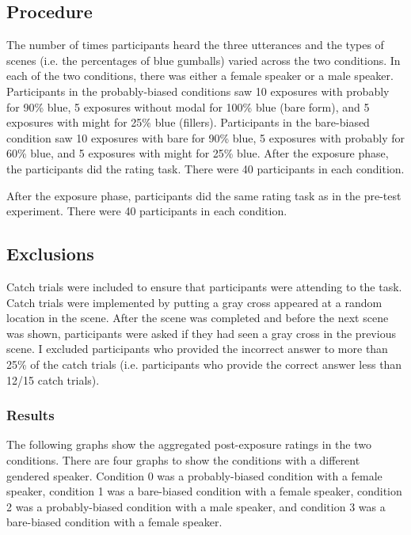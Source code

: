 \documentclass{sp}          %
\begin{document}
\subsection{Procedure}
The number of times participants heard the three utterances and the types of scenes (i.e. the percentages of blue gumballs) varied across the two conditions. In each of the two conditions, there was either a female speaker or a male speaker. Participants in the probably-biased conditions saw 10 exposures with probably for 90\% blue, 5 exposures without modal for 100\% blue (bare form), and 5 exposures with might for 25\% blue (fillers). Participants in the bare-biased condition saw 10 exposures with bare for 90\% blue, 5 exposures with probably for 60\% blue, and 5 exposures with might for 25\% blue. 
After the exposure phase, the participants did the rating task. There were 40 participants in each condition. 


After the exposure phase, participants did the same rating task as in the pre-test experiment. There were 40 participants in each condition.

\subsection{Exclusions}
Catch trials were included to ensure that participants were attending to the task. Catch trials were implemented by putting a gray cross appeared at a random location in the scene. After the scene was completed and before the next scene was shown, participants were asked if they had seen a gray cross in the previous scene. I excluded participants who provided the incorrect answer to more than 25\% of the catch trials (i.e. participants who provide the correct answer less than 12/15 catch trials).


\subsubsection{Results}

The following graphs show the aggregated post-exposure ratings in the two conditions. There are four graphs to show the conditions with a different gendered speaker. Condition 0 was a probably-biased condition with a female speaker, condition 1 was a bare-biased condition with a female speaker, condition 2 was a probably-biased condition with a male speaker, and condition 3 was a bare-biased condition with a female speaker. 
\end{document}
